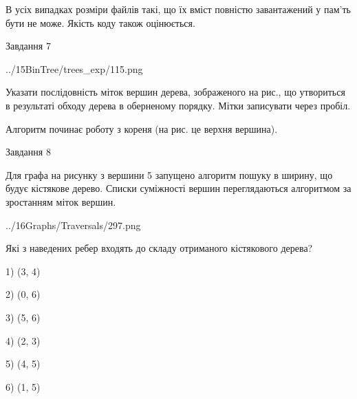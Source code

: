 \documentclass[12pt, ukrainian]{article}
\begin{document}
{В усіх випадках розміри файлів такі, що їх вміст повністю завантажений у пам'ть бути не може. Якість коду також оцінюється.



\vspace{10mm}\par

\newpage
\begin{minipage}[t]{9.7cm}
               
{\begin{center}Завдання {7}\end{center}}
\vspace{-4mm}

\begin{center}
	{../15BinTree/trees_exp/115.png}
\end{center}
Указати послідовність міток вершин дерева, зображеного на рис., що утвориться в результаті обходу дерева в оберненому порядку. Мітки записувати через пробіл.\par Алгоритм починає роботу з кореня (на рис. це верхня вершина).\par

\end{minipage}
\vline \hspace{8mm}
\begin{minipage}[t]{8.0cm}
               
{\begin{center}Завдання {8}\end{center}}
\vspace{-4mm}
Для графа на рисунку з вершини 5 запущено алгоритм пошуку в ширину, що будує кістякове дерево. Списки суміжності вершин переглядаються алгоритмом за зростанням міток вершин.\par
\begin{center}
	{../16Graphs/Traversals/297.png}
\end{center}
\par Які з наведених ребер входять до складу отриманого кістякового дерева?\par
1) (3, 4)\par
2) (0, 6)\par
3) (5, 6)\par
4) (2, 3)\par
5) (4, 5)\par
6) (1, 5)\par
{\vskip 15pt} \par


\end{minipage}}
\end{document}
